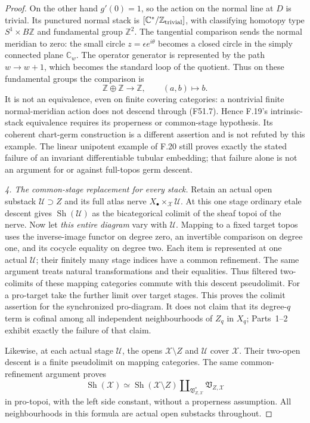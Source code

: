 \begin{proof}
On the other hand $g'(0)=1$, so the action on the normal line at
$D$ is trivial. Its punctured normal stack is
$[\mathbb C^*/\mathbb Z_{\rm trivial}]$, with classifying
homotopy type $S^1\times B\mathbb Z$ and fundamental group
$\mathbb Z^2$. The tangential comparison sends the normal meridian
to zero: the small circle $z=\epsilon e^{i\theta}$ becomes a
closed circle in the simply connected plane $\mathbb C_w$.
The operator generator is represented by the path $w\to w+1$,
which becomes the standard loop of the quotient. Thus on these
fundamental groups the comparison is
\[
 \mathbb Z\oplus\mathbb Z\longrightarrow\mathbb Z,
                    \qquad(a,b)\longmapsto b.              \tag{F51.7}
\]
It is not an equivalence, even on finite covering categories: a
nontrivial finite normal-meridian action does not descend through
(F51.7). Hence F.19's intrinsic-stack equivalence requires its
properness or common-stage hypothesis. Its coherent chart-germ
construction is a different assertion and is not refuted by this
example. The linear unipotent example of F.20 still proves exactly
the stated failure of an invariant differentiable tubular embedding;
that failure alone is not an argument for or against full-topos
germ descent.

\emph{4. The common-stage replacement for every stack.}
Retain an actual open substack $\mathcal U\supset Z$ and its full
atlas nerve $X_\bullet\times_{\mathcal X}\mathcal U$.
At this one stage ordinary etale descent gives
$\operatorname{Sh}(\mathcal U)$ as the bicategorical colimit of
the sheaf topoi of the nerve. Now let \emph{this entire diagram}
vary with $\mathcal U$. Mapping to a fixed target topos uses the
inverse-image functor on degree zero, an invertible comparison on
degree one, and its cocycle equality on degree two. Each item is
represented at one actual $\mathcal U$; their finitely many stage
indices have a common refinement. The same argument treats natural
transformations and their equalities. Thus filtered two-colimits
of these mapping categories commute with this descent pseudolimit.
For a pro-target take the further limit over target stages. This
proves the colimit assertion for the synchronized pro-diagram.
It does not claim that its degree-$q$ term is cofinal among all
independent neighbourhoods of $Z_q$ in $X_q$; Parts~1--2 exhibit
exactly the failure of that claim.

Likewise, at each actual stage $\mathcal U$, the opens
$\mathcal X\setminus Z$ and $\mathcal U$ cover $\mathcal X$.
Their two-open descent is a finite pseudolimit on mapping
categories. The same common-refinement argument proves
\[
 \operatorname{Sh}(\mathcal X)\simeq
 \operatorname{Sh}(\mathcal X\setminus Z)
   \amalg_{\mathfrak V^*_{Z,\mathcal X}}
                 \mathfrak V_{Z,\mathcal X}
                                                        \tag{F51.8}
\]
in pro-topoi, with the left side constant, without a properness
assumption. All neighbourhoods in this formula are actual open
substacks throughout.


\end{proof}
